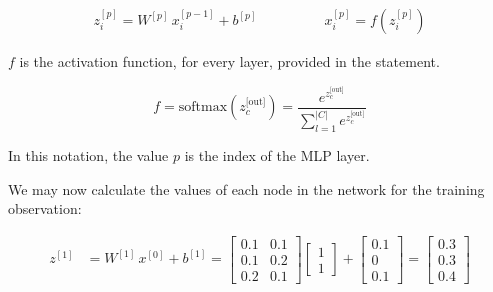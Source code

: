 \documentclass[12pt]{article}
\begin{document}
\begin{enumerate}
\begin{align*}
z^{[p]}_i = W^{[p]} \, x^{[p-1]}_i + b^{[p]} & \qquad\qquad
x^{[p]}_i = f\left(z^{[p]}_i\right)
\end{align*}

$f$ is the activation function, for every layer, provided in the statement.

\begin{equation*}
    f = \text{softmax}(z_c^\text{[out]}) = \frac{e^{z_c^\text{[out]}}}{\sum_{l=1}^{|C|} e^{z_c^\text{[out]}}}
\end{equation*}

\vspace{10pt}
In this notation, the value $p$ is the index of the MLP layer.


We may now calculate the values of each node in the network for the training observation:

\vspace{10pt}
\begin{equation*}
    \begin{aligned}
        z^{[1]} &= W^{[1]} \, x^{[0]} + b^{[1]} = \begin{bmatrix}
            0.1 & 0.1 \\
            0.1 & 0.2 \\
            0.2 & 0.1
        \end{bmatrix} \begin{bmatrix}
            1 \\
            1
        \end{bmatrix} + \begin{bmatrix}
            0.1 \\
            0 \\
            0.1
        \end{bmatrix} = \begin{bmatrix}
            0.3 \\
            0.3 \\
            0.4
        \end{bmatrix} \\
    \end{aligned}
\end{equation*}


\end{enumerate}
\end{document}
